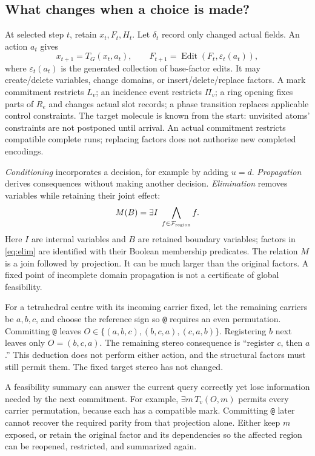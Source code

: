 \documentclass[11pt,a4paper]{article}
\newcommand{\F}{\mathcal F}
\newcommand{\ttt}[1]{\texttt{#1}}
\begin{document}
\subsection{What changes when a choice is made?}
At selected step \(t\), retain \(x_t,F_t,H_t\). Let \(\delta_t\) record only
changed actual fields. An action \(a_t\) gives
\[
 x_{t+1}=T_G(x_t,a_t),\qquad
 F_{t+1}=\operatorname{Edit}(F_t,\varepsilon_t(a_t)),
\]
where \(\varepsilon_t(a_t)\) is the generated collection of base-factor edits.
It may create/delete variables, change domains, or insert/delete/replace
factors. A mark commitment restricts \(L_v\); an incidence event restricts
\(\Pi_v\); a ring opening fixes parts of \(R_e\) and changes actual slot records;
a phase transition replaces applicable control constraints. The target molecule
is known from the start: unvisited atoms' constraints are not postponed until
arrival. An actual commitment restricts compatible complete runs; replacing
factors does not authorize new completed encodings.\cite{note127}

\emph{Conditioning} incorporates a decision, for example by adding \(u=d\).
\emph{Propagation} derives consequences without making another decision.
\emph{Elimination} removes variables while retaining their joint effect:
\begin{equation}\label{eq:elim}
 M(B)=\exists I\;\bigwedge_{f\in\F_{\rm region}} f.
\end{equation}
Here \(I\) are internal variables and \(B\) are retained boundary variables;
factors in \eqref{eq:elim} are identified with their Boolean membership
predicates. The relation \(M\) is a join followed by projection. It can be much
larger than the original factors. A fixed point of incomplete domain propagation
is not a certificate of global feasibility.\cite{poole}

For a tetrahedral centre with its incoming carrier fixed, let the remaining
carriers be \(a,b,c\), and choose the reference sign so \ttt{@} requires an even
permutation. Committing \ttt{@} leaves
\(O\in\{(a,b,c),(b,c,a),(c,a,b)\}\). Registering \(b\) next leaves only
\(O=(b,c,a)\). The remaining stereo consequence is ``register \(c\), then \(a\).''
This deduction does not perform either action, and the structural factors must
still permit them. The fixed target stereo has not changed.

A feasibility summary can answer the current query correctly yet lose
information needed by the next commitment. For example, \(\exists m\,T_v(O,m)\) permits every carrier permutation, because each
has a compatible mark. Committing \ttt{@} later cannot recover the required
parity from that projection alone. Either keep \(m\) exposed, or retain the
original factor and its dependencies so the affected region can be reopened,
restricted, and summarized again.
\end{document}
